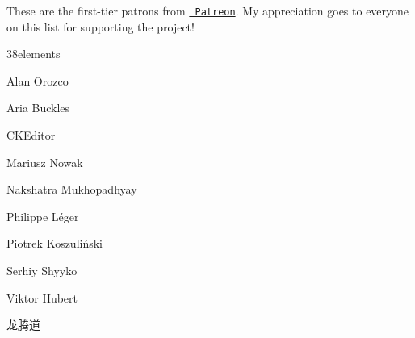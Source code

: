 These are the first-\/tier patrons from \href{https://www.patreon.com/fabiosantoscode}{\texttt{ Patreon}}. My appreciation goes to everyone on this list for supporting the project!


\begin{DoxyItemize}
\item 38elements
\item Alan Orozco
\item Aria Buckles
\item CKEditor
\item Mariusz Nowak
\item Nakshatra Mukhopadhyay
\item Philippe Léger
\item Piotrek Koszuliński
\item Serhiy Shyyko
\item Viktor Hubert
\item 龙腾道 
\end{DoxyItemize}